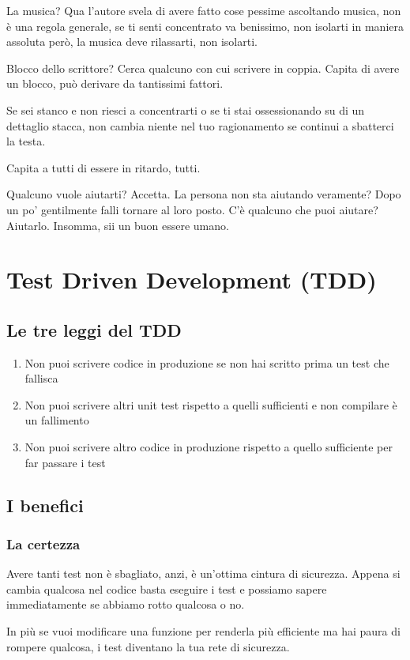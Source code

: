 \documentclass[11pt,a4paper]{book}
\begin{document}
La musica? Qua l'autore svela di avere fatto cose pessime ascoltando musica, non è una regola generale, se ti senti concentrato va benissimo, non isolarti in maniera assoluta però, la musica deve rilassarti, non isolarti.

Blocco dello scrittore? Cerca qualcuno con cui scrivere in coppia. Capita di avere un blocco, può derivare da tantissimi fattori.

Se sei stanco e non riesci a concentrarti o se ti stai ossessionando su di un dettaglio stacca, non cambia niente nel tuo ragionamento se continui a sbatterci la testa.

Capita a tutti di essere in ritardo, tutti.

Qualcuno vuole aiutarti? Accetta. La persona non sta aiutando veramente? Dopo un po' gentilmente falli tornare al loro posto. C'è qualcuno che puoi aiutare? Aiutarlo. Insomma, sii un buon essere umano.

\chapter{Test Driven Development (TDD)}
\section{Le tre leggi del TDD}
\begin{enumerate}
	\item Non puoi scrivere codice in produzione se non hai scritto prima un test che fallisca
	\item Non puoi scrivere altri unit test rispetto a quelli sufficienti e non compilare è un fallimento
	\item Non puoi scrivere altro codice in produzione rispetto a quello sufficiente per far passare i test
\end{enumerate}

\section{I benefici}
\subsection{La certezza}
Avere tanti test non è sbagliato, anzi, è un'ottima cintura di sicurezza. Appena si cambia qualcosa nel codice basta eseguire i test e possiamo sapere immediatamente se abbiamo rotto qualcosa o no.

In più se vuoi modificare una funzione per renderla più efficiente ma hai paura di rompere qualcosa, i test diventano la tua rete di sicurezza.
\end{document}
